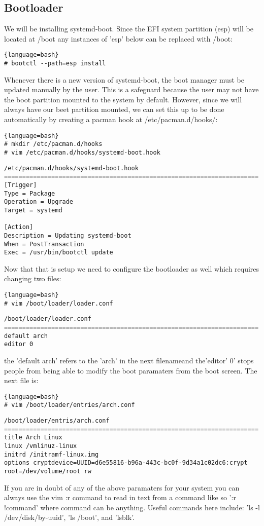 \subsection{Bootloader}
We will be installing systemd-boot.
Since the EFI system partition (esp) will be located at /boot any instances of 'esp' below can be replaced with /boot:
\begin{lstlisting}{language=bash}
# bootctl --path=esp install
\end{lstlisting}
Whenever there is a new version of systemd-boot, the boot manager must be updated manually by the user. This is a safeguard because the user may not have the boot partition mounted to the system by default. However, since we will always have our beet partition mounted, we can set this up to be done automatically by creating a pacman hook at /etc/pacman.d/hooks/:
\begin{lstlisting}{language=bash}
# mkdir /etc/pacman.d/hooks
# vim /etc/pacman.d/hooks/systemd-boot.hook
\end{lstlisting}
\begin{verbatim}
/etc/pacman.d/hooks/systemd-boot.hook
======================================================================
[Trigger]
Type = Package
Operation = Upgrade
Target = systemd

[Action]
Description = Updating systemd-boot
When = PostTransaction
Exec = /usr/bin/bootctl update
\end{verbatim}
Now that that is setup we need to configure the bootloader as well which requires changing two files:
\begin{lstlisting}{language=bash}
# vim /boot/loader/loader.conf
\end{lstlisting}
\begin{verbatim}
/boot/loader/loader.conf
======================================================================
default arch
editor 0
\end{verbatim}
the 'default arch' refers to the 'arch' in the next filenameand the'editor' 0' stops people from being able to modify the boot paramaters from the boot screen. The next file is:
\begin{lstlisting}{language=bash}
# vim /boot/loader/entries/arch.conf
\end{lstlisting}
\begin{verbatim}
/boot/loader/entris/arch.conf
======================================================================
title Arch Linux
linux /vmlinuz-linux
initrd /initramf-linux.img
options cryptdevice=UUID=d6e55816-b96a-443c-bc0f-9d34a1c02dc6:crypt root=/dev/volume/root rw
\end{verbatim}
If you are in doubt of any of the above paramaters for your system you can always use the vim :r command to read in text from a command like so ':r !command' where command can be anything. Useful commands here include: 'ls -l /dev/disk/by-uuid', 'ls /boot', and 'lsblk'.

